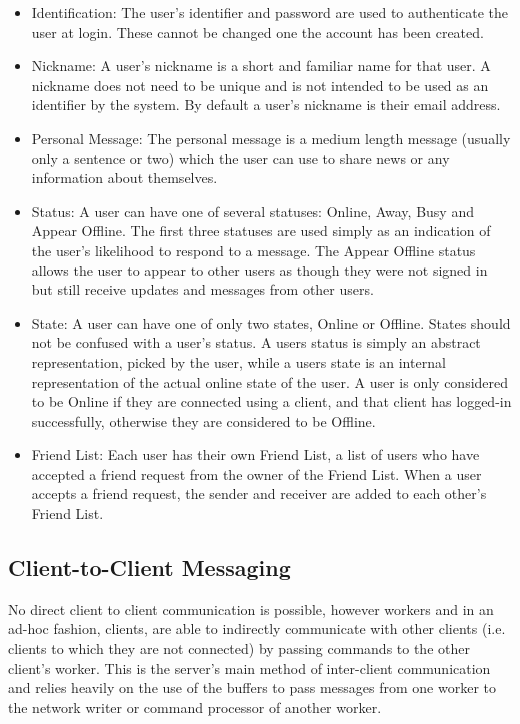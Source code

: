 \begin{itemize}
\item{Identification:
The user's identifier and password are used to authenticate the user at login. These cannot be changed one the account has been created.} 

\item{Nickname:
A user's nickname is a short and familiar name for that user. A nickname does not need to be unique and is not intended to be used as an identifier by the system. By default a user's nickname is their email address.}

\item{Personal Message:
The personal message is a medium length message (usually only a sentence or two) which the user can use to share news or any information about themselves.}

\item{Status:
A user can have one of several statuses: Online, Away, Busy and Appear Offline. The first three statuses are used simply as an indication of the user's likelihood to respond to a message. The Appear Offline status allows the user to appear to other users as though they were not signed in but still receive updates and messages from other users.}

\item{State:
A user can have one of only two states, Online or Offline. States should not be confused with a user's status. A users status is simply an abstract representation, picked by the user, while a users state is an internal representation of the actual online state of the user. A user is only considered to be Online if they are connected using a client, and that client has logged-in successfully, otherwise they are considered to be Offline.}

\item{Friend List:
Each user has their own Friend List, a list of users who have accepted a friend request from the owner of the Friend List. When a user accepts a friend request, the sender and receiver are added to each other's Friend List.}
\end{itemize}

\subsection{Client-to-Client Messaging}
\label{c2c}
No direct client to client communication is possible, however workers and in an ad-hoc fashion, clients, are able to indirectly communicate with other clients (i.e. clients to which they are not connected) by passing commands to the other client's worker. This is the server's main method of inter-client communication and relies heavily on the use of the buffers to pass messages from one worker to the network writer or command processor of another worker.

